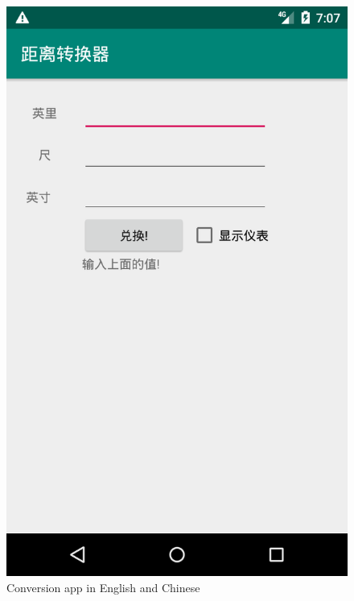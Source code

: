 \documentclass{scrartcl}
\begin{document}
\begin{figure}[h]
    \includegraphics[scale=0.2]{images/chinese.png}
    \caption{Conversion app in English and Chinese}
\end{figure}
\end{document}
